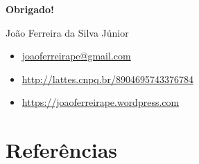 \documentclass[
  11pt,
  aspectratio=169,
  english,                    %
  french,                     %
  spanish,                    %
  brazil                      %
  ]{beamer}
\makeatletter
\def\professor{João Ferreira da Silva Júnior}
\def\professoremail{joaoferreirape@gmail.com}
\def\professorsite{https://joaoferreirape.wordpress.com}
\def\professorlattes{http://lattes.cnpq.br/8904695743376784}
\makeatother
\begin{document}
{
  \begin{frame}[plain,t]

    \vfill
    \vspace*{0.15\paperheight}

    \begin{center}
      \Huge{\textbf{Obrigado!}}
    \end{center}

    \vspace*{0.15\paperheight}
    \vfill

    \begin{block}{\professor}
      \justifying{}
      \begin{itemize}
        \justifying{}
        \setlength\itemsep{1em}
        \item \href{mailto:\professoremail}{\professoremail}
        \item \href{\professorlattes}{\professorlattes}
        \item \href{professorsite}{\professorsite}
      \end{itemize}
    \end{block}

  \end{frame}
} %



\section[Referências]{Referências}\label{sec:referencias}
\end{document}
